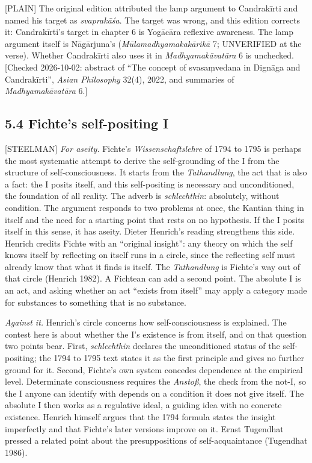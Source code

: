 \documentclass[11pt]{article}
\newcommand{\register}[1]{{\ttfamily\small #1}}
\begin{document}
\register{[PLAIN]} The original edition attributed the lamp argument to Candrakīrti and named his target as \emph{svaprakāśa}. The target was wrong, and this edition corrects it: Candrakīrti's target in chapter 6 is Yogācāra reflexive awareness. The lamp argument itself is Nāgārjuna's (\emph{Mūlamadhyamakakārikā} 7; UNVERIFIED at the verse). Whether Candrakīrti also uses it in \emph{Madhyamakāvatāra} 6 is unchecked. [Checked 2026-10-02: abstract of ``The concept of svasaṃvedana in Dignāga and Candrakīrti'', \emph{Asian Philosophy} 32(4), 2022, and summaries of \emph{Madhyamakāvatāra} 6.]

\subsection*{5.4 Fichte's self-positing I}

\register{[STEELMAN]} \emph{For aseity.} Fichte's \emph{Wissenschaftslehre} of 1794 to 1795 is perhaps the most systematic attempt to derive the self-grounding of the I from the structure of self-consciousness. It starts from the \emph{Tathandlung}, the act that is also a fact: the I posits itself, and this self-positing is necessary and unconditioned, the foundation of all reality. The adverb is \emph{schlechthin}: absolutely, without condition. The argument responds to two problems at once, the Kantian thing in itself and the need for a starting point that rests on no hypothesis. If the I posits itself in this sense, it has aseity. Dieter Henrich's reading strengthens this side. Henrich credits Fichte with an ``original insight'': any theory on which the self knows itself by reflecting on itself runs in a circle, since the reflecting self must already know that what it finds is itself. The \emph{Tathandlung} is Fichte's way out of that circle (Henrich 1982). A Fichtean can add a second point. The absolute I is an act, and asking whether an act ``exists from itself'' may apply a category made for substances to something that is no substance.

\emph{Against it.} Henrich's circle concerns how self-consciousness is explained. The contest here is about whether the I's existence is from itself, and on that question two points bear. First, \emph{schlechthin} declares the unconditioned status of the self-positing; the 1794 to 1795 text states it as the first principle and gives no further ground for it. Second, Fichte's own system concedes dependence at the empirical level. Determinate consciousness requires the \emph{Anstoß}, the check from the not-I, so the I anyone can identify with depends on a condition it does not give itself. The absolute I then works as a regulative ideal, a guiding idea with no concrete existence. Henrich himself argues that the 1794 formula states the insight imperfectly and that Fichte's later versions improve on it. Ernst Tugendhat pressed a related point about the presuppositions of self-acquaintance (Tugendhat 1986).
\end{document}
